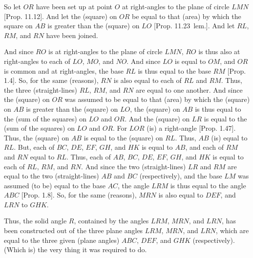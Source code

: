 \begin{Parallel}{}{}
{So let $OR$ have been set up at point $O$ at right-angles to the plane
of circle $LMN$ [Prop. 11.12]. And let the (square) on $OR$ be equal to that (area) by which the square on $AB$ is greater than the
(square) on $LO$ [Prop. 11.23~lem.]. And let $RL$, $RM$, and $RN$ have been joined.

And since $RO$ is at right-angles to the plane of circle $LMN$, $RO$
is thus also at right-angles to each of $LO$, $MO$, and $NO$. And since
$LO$ is equal to $OM$, and $OR$ is common and at right-angles,
the base $RL$ is thus equal to the base $RM$ [Prop. 1.4]. So, for the same (reasons), $RN$ is also equal to
each of $RL$ and $RM$. Thus, the three (straight-lines) $RL$, $RM$,
and $RN$ are equal to one another. And since the (square) on $OR$
was assumed to be equal to that (area) by which the (square) on $AB$
is greater than the (square) on $LO$, the (square) on $AB$ is thus equal
to the (sum of the squares) on $LO$ and $OR$. And the (square) on 
$LR$ is equal to the (sum of the squares) on $LO$ and $OR$. For $LOR$ (is) a right-angle  [Prop. 1.47]. Thus,
the (square) on $AB$ is equal to the (square) on $RL$. Thus, $AB$ (is)
equal to $RL$. But, each of $BC$, $DE$, $EF$, $GH$, and $HK$
is equal to $AB$, and each of $RM$ and $RN$ equal to $RL$. Thus,
each of $AB$, $BC$, $DE$, $EF$, $GH$, and $HK$ is equal to each of
$RL$, $RM$, and $RN$. And since the two (straight-lines)
$LR$ and $RM$ are equal to the two (straight-lines) $AB$ and $BC$ (respectively), and the base $LM$ was assumed (to be) equal to the
base $AC$, the angle $LRM$ is thus equal to the angle $ABC$
[Prop. 1.8]. So, for the same (reasons), $MRN$
is also equal to $DEF$, and $LRN$ to $GHK$.

Thus, the solid angle $R$, contained by the angles $LRM$, $MRN$, and $LRN$,  has been constructed out of the three plane
angles $LRM$, $MRN$, and $LRN$, which are equal to the three
given (plane angles) $ABC$, $DEF$, and $GHK$ (respectively). 
(Which is) the very thing it was required to do.}
\end{Parallel}~\\

